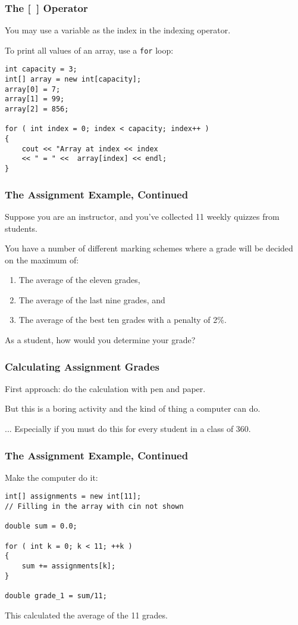 \begin{frame}[fragile]
\frametitle{The [~] Operator}

You may use a variable as the index in the indexing operator.

To print all values of an array, use a \texttt{for} loop:

\begin{verbatim}
int capacity = 3;
int[] array = new int[capacity];
array[0] = 7;
array[1] = 99;
array[2] = 856;

for ( int index = 0; index < capacity; index++ )
{
    cout << "Array at index << index 
    << " = " <<  array[index] << endl;
}
\end{verbatim}

\end{frame}

\begin{frame}
\frametitle{The Assignment Example, Continued}

Suppose you are an instructor, and you've collected 11 weekly quizzes from students.

You have a number of different marking schemes where a grade will be decided on the maximum of:
\begin{enumerate}
\item The average of the eleven grades,
\item The average of the last nine grades, and
\item The average of the best ten grades with a penalty of 2\%.
\end{enumerate}

As a student, how would you determine your grade? 

\end{frame}

\begin{frame}
\frametitle{Calculating Assignment Grades}
First approach: do the calculation with pen and paper.

But this is a boring activity and the kind of thing a computer can do.

... Especially if you must do this for every student in a class of 360.

\end{frame}

\begin{frame}[fragile]
\frametitle{The Assignment Example, Continued}
Make the computer do it:
\begin{verbatim}
int[] assignments = new int[11];
// Filling in the array with cin not shown

double sum = 0.0;

for ( int k = 0; k < 11; ++k )
{
    sum += assignments[k];
}

double grade_1 = sum/11;
\end{verbatim}

This calculated the average of the 11 grades.

\end{frame}

